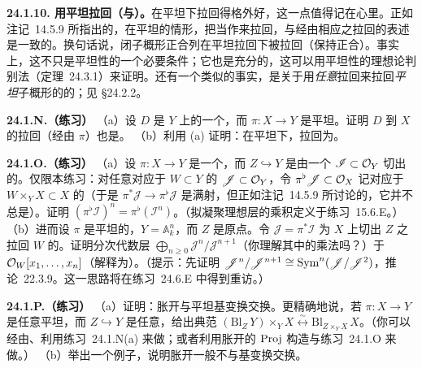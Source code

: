 \textbf{24.1.10. 用平坦\trMorphism{}拉回\trClosedSubscheme{}（与\trIdealSheaf）。}\quad \trClosedSubscheme{}在平坦\trMorphism{}下拉回得格外好，这一点值得记在心里。正如\mbox{注记~14.5.9} 所指出的，在平坦\trMorphism{}的情形，把\trIdealSheaf{}当作\trQCSheaf{}来拉回，与经由相应\trClosedSubscheme{}之拉回的表述是一致的。换句话说，闭子概形正合列在平坦拉回下被拉回（保持正合）。事实上，这不只是平坦性的一个必要条件；它也是充分的，这可以用平坦性的理想论判别法（\mbox{定理~24.3.1}）来证明。还有一个类似的事实，是关于用\emph{任意}拉回来拉回\emph{平坦}子概形的\trIdealSheaf{}的；见 \S24.2.2。

\textbf{24.1.N.（练习）}\quad
（a）设 $D$ 是 $Y$ 上的一个\trEffectiveCartierDivisor，而 $\pi\colon X\to Y$ 是平坦\trMorphism。证明 $D$ 到 $X$ 的拉回（经由 $\pi$）也是\trEffectiveCartierDivisor。
（b）利用 (a) 证明：在平坦\trMorphism{}下，\trRegularEmbedding{}拉回为\trRegularEmbedding。

\textbf{24.1.O.（练习）}\quad
（a）设 $\pi\colon X\to Y$ 是一个\trMorphism，而 $Z\hookrightarrow Y$ 是由一个\trIdealSheaf{} $\mathscr{I}\subset\mathcal{O}_Y$ 切出的\trClosedEmbedding。仅限本练习：对任意对应于\trClosedSubscheme{} $W\subset Y$ 的\trIdealSheaf{} $\mathscr{J}\subset\mathcal{O}_Y$，令 $\pi^{\flat}\mathscr{J}\subset\mathcal{O}_X$ 记对应于 $W\times_Y X\subset X$ 的\trIdealSheaf（于是 $\pi^{*}\mathscr{J}\to\pi^{\flat}\mathscr{J}$ 是满射，但正如\mbox{注记~14.5.9} 所讨论的，它并不总是\trIsomorphism）。证明 $(\pi^{\flat}\mathscr{I})^{n}=\pi^{\flat}(\mathscr{I}^{n})$。（拟凝聚理想层的乘积定义于\mbox{练习~15.6.E}。）
（b）进而设 $\pi$ 是平坦的，$Y=\mathbb{A}^{n}_k$，而 $Z$ 是原点。令 $\mathscr{J}=\pi^{*}\mathscr{I}$ 为 $X$ 上切出 $Z$ 之拉回 $W$ 的\trQC{}\trSheafOfAlgebras。证明分次代数层 $\bigoplus_{n\ge 0}\mathscr{J}^{n}/\mathscr{J}^{n+1}$（你理解其中的乘法吗？）\trIsomorphic{}于 $\mathcal{O}_W[x_1,\dots,x_n]$（解释为\trSheafOfGradedAlgebras）。（提示：先证明 $\mathscr{J}^{n}/\mathscr{J}^{n+1}\cong\operatorname{Sym}^{n}(\mathscr{J}/\mathscr{J}^{2})$，\mbox{推论~22.3.9}。这一思路将在\mbox{练习~24.6.E} 中得到重访。）

\textbf{24.1.P.（练习）}\quad
（a）证明：胀开与平坦基变换交换。更精确地说，若 $\pi\colon X\to Y$ 是任意平坦\trMorphism，而 $Z\hookrightarrow Y$ 是任意\trClosedEmbedding，给出典范\trIsomorphism{} $(\mathrm{Bl}_{Z}\,Y)\times_Y X\overset{\sim}{\longleftrightarrow}\mathrm{Bl}_{Z\times_Y X}\,X$。（你可以经由\trUniversalProperty、利用\mbox{练习~24.1.N}(a) 来做；或者利用胀开的 $\operatorname{Proj}$ 构造与\mbox{练习~24.1.O} 来做。）
（b）举出一个例子，说明胀开一般不与基变换交换。

